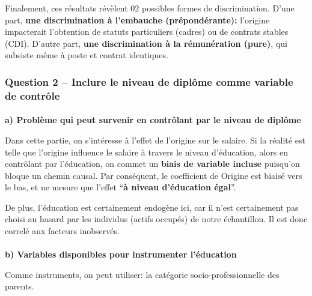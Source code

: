 \documentclass[
  letterpaper,
  DIV=11,
  numbers=noendperiod]{scrartcl}
\makeatletter
\let\oldparagraph\paragraph
\renewcommand{\paragraph}{
    \@ifstar
      \xxxParagraphStar
      \xxxParagraphNoStar
  }
\newcommand{\xxxParagraphStar}[1]{\oldparagraph*{#1}\mbox{}}
\newcommand{\xxxParagraphNoStar}[1]{\oldparagraph{#1}\mbox{}}
\makeatother
\begin{document}
Finalement, ces résultats révèlent 02 possibles formes de
discrimination. D'une part, \textbf{une discrimination à l'embauche
(prépondérante):} l'origine impacterait l'obtention de statuts
particuliers (cadres) ou de contrats stables (CDI). D'autre part,
\textbf{une discrimination à la rémunération (pure)}, qui subsiste même
à poste et contrat identiques.

\subsubsection{Question 2 -- Inclure le niveau de diplôme comme variable
de
contrôle}\label{question-2-inclure-le-niveau-de-dipluxf4me-comme-variable-de-contruxf4le}

\paragraph{\texorpdfstring{\textbf{a) Problème qui peut survenir en
contrôlant par le niveau de
diplôme}}{a) Problème qui peut survenir en contrôlant par le niveau de diplôme}}\label{a-probluxe8me-qui-peut-survenir-en-contruxf4lant-par-le-niveau-de-dipluxf4me}

Dans cette partie, on s'intéresse à l'effet de l'origine sur le salaire.
Si la réalité est telle que l'origine influence le salaire à travers le
niveau d'éducation, alors en contrôlant par l'éducation, on commet un
\textbf{biais de variable incluse} puisqu'on bloque un chemin causal.
Par conséquent, le coefficient de Origine est biaisé vers le bas, et ne
mesure que l'effet ``\textbf{à niveau d'éducation égal}''.

De plus, l'éducation est certainement endogène ici, car il n'est
certainement pas choisi au hasard par les individus (actifs occupés) de
notre échantillon. Il est donc correlé aux facteurs inobservés.

\paragraph{\texorpdfstring{\textbf{b) Variables disponibles pour
instrumenter
l'éducation}}{b) Variables disponibles pour instrumenter l'éducation}}\label{b-variables-disponibles-pour-instrumenter-luxe9ducation}

Comme instruments, on peut utiliser: la catégorie socio-professionnelle
des parents.
\end{document}
